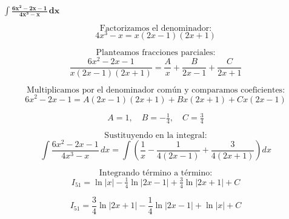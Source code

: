 $\displaystyle \mathbf{\int \frac{6x^{2} - 2x - 1}{4x^{3} - x}\,dx}$

\nopagebreak
\[
\text{Factorizamos el denominador:}
\]
\[
4x^{3} - x = x(2x - 1)(2x + 1)
\]

\[
\text{Planteamos fracciones parciales:}
\]
\[
\frac{6x^{2} - 2x - 1}{x(2x - 1)(2x + 1)}
= \frac{A}{x} + \frac{B}{2x - 1} + \frac{C}{2x + 1}
\]

\[
\text{Multiplicamos por el denominador común y comparamos coeficientes:}
\]
\[
6x^{2} - 2x - 1 = A(2x - 1)(2x + 1) + Bx(2x + 1) + Cx(2x - 1)
\]

\[
A = 1, \quad B = -\tfrac{1}{4}, \quad C = \tfrac{3}{4}
\]

\[
\text{Sustituyendo en la integral:}
\]
\[
\int \frac{6x^{2} - 2x - 1}{4x^{3} - x}\,dx
= \int\!\left(\frac{1}{x} - \frac{1}{4(2x - 1)} + \frac{3}{4(2x + 1)}\right)dx
\]

\[
\text{Integrando término a término:}
\]
\[
I_{51}
= \ln|x| - \tfrac{1}{4}\ln|2x - 1| + \tfrac{3}{4}\ln|2x + 1| + C
\]

\[
\boxed{\displaystyle
I_{51}
= \frac{3}{4}\ln|2x + 1|
- \frac{1}{4}\ln|2x - 1|
+ \ln|x| + C
}
\]
